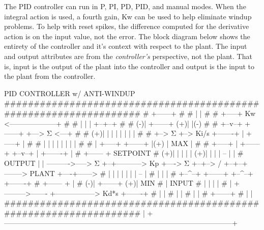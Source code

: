 The P\-I\-D controller can run in P, P\-I, P\-D, P\-I\-D, and manual modes. When the integral action is used, a fourth gain, Kw can be used to help eliminate windup problems. To help with reset spikes, the difference computed for the derivative action is on the input value, not the error. The block diagram below shows the entirety of the controller and it's context with respect to the plant. The {\ttfamily input} and {\ttfamily output} attributes are from the {\itshape controller's} perspective, not the plant. That is, {\ttfamily input} is the output of the plant into the controller and {\ttfamily output} is the input to the plant from the controller.\par
\begin{DoxyVerb}                               PID CONTROLLER w/ ANTI-WINDUP 
            ##################################################################
            #                          +------+                              #
            #                          |      |                              #
            #                    +-----+  Kw  <--------------------+         #
            #                    |     |      |                 +--+--+      #
            #                 (-)|     +------+              (+)|     |(-)   #
            #                 +--v--+  +------+             +--->  Σ  <---+  #
            #              (+)|     |  |      |             |   |     |   |  #
            #              +-->  Σ  +--> Ki/s +-------+     |   +-----+   |  #
            #              |  |     |  |      |       |     |             |  #
            #              |  +-----+  +------+       |(+)  |        MAX  |  #
            #     +-----+  |           +------+    +--v--+  |  +-------+  |  #        +------ +
  SETPOINT  #  (+)|     |  |           |      | (+)|     |  |  |    -- |  |  # OUTPUT |       |
  ---------->----->  Σ  +--+----------->  Kp  +---->  Σ  +--+-->   /   +--+--+--------> PLANT +----+------>
            #     |     |              |      |    |     |     | --    |     #        |       |    |
            #     +--^--+              +------+    +--^--+     +-------+     #        +------ +    |
            #     (-)|                 +------+    (+)|        MIN           #                     |
  INPUT     #        |                 |      |       |                      #                     |
  +--------->------- +-----------------> Kd*s +-------+                      #                     |
  |         #                          |      |                              #                     |
  |         #                          +------+                              #                     |
  |         ##################################################################                     |
  +------------------------------------------------------------------------------------------------+
\end{DoxyVerb}
